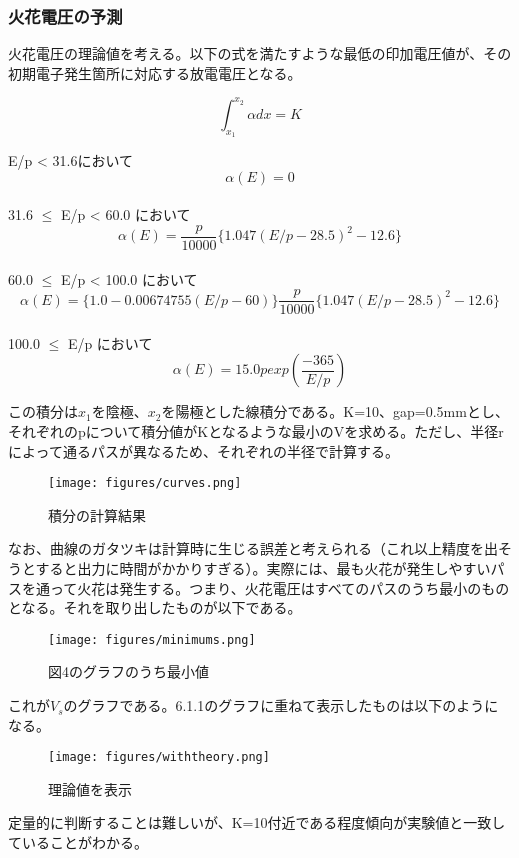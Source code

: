 \documentclass{ltjsarticle}
\begin{document}
\subsubsection{火花電圧の予測}
火花電圧の理論値を考える。以下の式を満たすような最低の印加電圧値が、その初期電子発生箇所に対応する放電電圧となる。

\[
\int_{x_1}^{x_2} \alpha dx = K
\]

\begin{center}
E/p < 31.6において
\[
\alpha(E) = 0
\]
\\
31.6 $\leq$ E/p < 60.0 において
\[
\alpha(E) = \frac{p}{10000} \{ 1.047 (E/p - 28.5)^2 - 12.6 \}
\]
\\
60.0 $\leq$ E/p < 100.0 において
\[
\alpha(E) = \{1.0 - 0.00674755(E/p-60)\} \frac{p}{10000} \{1.047(E/p-28.5)^2 - 12.6\} 
\]
\\
100.0 $\leq$ E/p において
\[
\alpha(E) = 15.0 p exp(\frac{-365}{E/p})    
\]
\end{center}

この積分は$x_1$を陰極、$x_2$を陽極とした線積分である。K=10、gap=0.5mmとし、それぞれのpについて積分値がKとなるような最小のVを求める。ただし、半径rによって通るパスが異なるため、それぞれの半径で計算する。

\begin{figure}[H]
    \begin{center}
        \texttt{[image: figures/curves.png]}
        \caption{積分の計算結果}
    \end{center}
\end{figure}

なお、曲線のガタツキは計算時に生じる誤差と考えられる（これ以上精度を出そうとすると出力に時間がかかりすぎる）。実際には、最も火花が発生しやすいパスを通って火花は発生する。つまり、火花電圧はすべてのパスのうち最小のものとなる。それを取り出したものが以下である。

\begin{figure}[H]
    \begin{center}
        \texttt{[image: figures/minimums.png]}
        \caption{図4のグラフのうち最小値}
    \end{center}
\end{figure}

これが$V_s$のグラフである。6.1.1のグラフに重ねて表示したものは以下のようになる。

\begin{figure}[H]
    \begin{center}
        \texttt{[image: figures/withtheory.png]}
        \caption{理論値を表示}
    \end{center}
\end{figure}
定量的に判断することは難しいが、K=10付近である程度傾向が実験値と一致していることがわかる。
\end{document}
